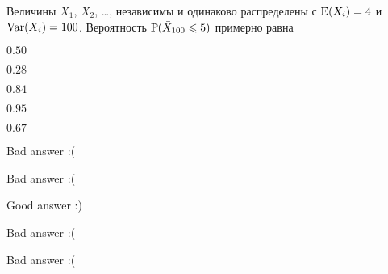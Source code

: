 
\begin{question}
Величины \(X_1\), \(X_2\), \ldots, независимы и одинаково распределены с
\(\E(X_i) = 4\) и \(\Var(X_i) = 100\). Вероятность
\(\P(\bar X_{100} \leq 5)\) примерно равна
\begin{answerlist}
  \item \(0.50\)
  \item \(0.28\)
  \item \(0.84\)
  \item \(0.95\)
  \item \(0.67\)
\end{answerlist}
\end{question}

\begin{solution}
\begin{answerlist}
  \item Bad answer :(
  \item Bad answer :(
  \item Good answer :)
  \item Bad answer :(
  \item Bad answer :(
\end{answerlist}
\end{solution}

